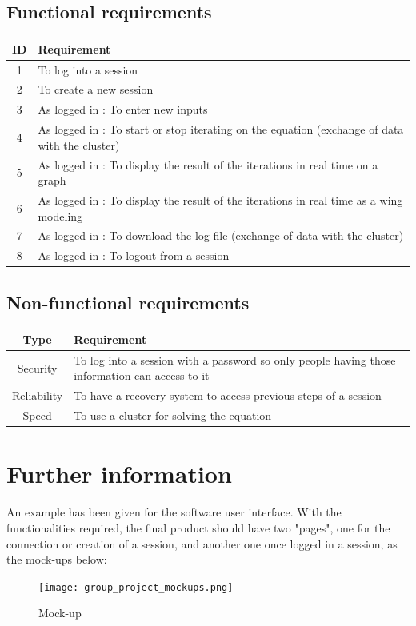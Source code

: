 \documentclass[10pt,a4paper]{report}
\begin{document}
\subsection{Functional requirements}
\begin{center}
\begin{tabular}{|c|p{}|}
\hline 
\textbf{ID} & \textbf{Requirement} \\ 
\hline 
1 & To log into a session \\ 
\hline 
2 & To create a new session \\ 
\hline 
3 & As logged in : To enter new inputs \\ 
\hline
4 & As logged in : To start or stop iterating on the equation (exchange of data with the cluster) \\ 
\hline
5 & As logged in : To display the result of the iterations in real time on a graph \\ 
\hline
6 & As logged in : To display the result of the iterations in real time as a wing modeling \\ 
\hline
7 & As logged in : To download the log file (exchange of data with the cluster)\\ 
\hline
8 & As logged in : To logout from a session \\ 
\hline
\end{tabular}
\end{center}

\subsection{Non-functional requirements}
\begin{center}
\begin{tabular}{|c|p{}|}
\hline 
\textbf{Type} & \textbf{Requirement} \\ 
\hline 
Security & To log into a session with a password so only people having those information can access to it \\ 
\hline 
Reliability & To have a recovery system to access previous steps of a session \\ 
\hline 
Speed & To use a cluster for solving the equation \\ 
\hline
\end{tabular} 
\end{center}

\section{Further information}
An example has been given for the software user interface. With the functionalities required, the final product should have two "pages", one for the connection or creation of a session, and another one once logged in a session, as the mock-ups below:\\
\begin{figure}[h!]
\texttt{[image: group\_project\_mockups.png]}
\caption{Mock-up}
\end{figure}
\end{document}
